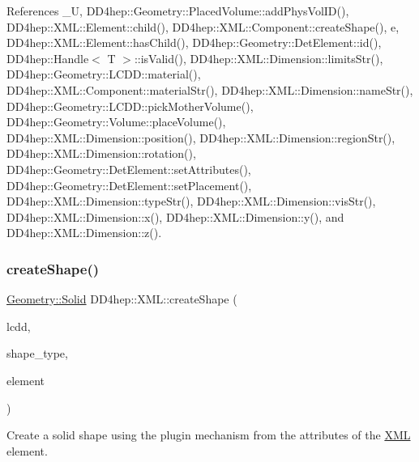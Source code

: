 References \+\_\+U, D\+D4hep\+::\+Geometry\+::\+Placed\+Volume\+::add\+Phys\+Vol\+I\+D(), D\+D4hep\+::\+X\+M\+L\+::\+Element\+::child(), D\+D4hep\+::\+X\+M\+L\+::\+Component\+::create\+Shape(), e, D\+D4hep\+::\+X\+M\+L\+::\+Element\+::has\+Child(), D\+D4hep\+::\+Geometry\+::\+Det\+Element\+::id(), D\+D4hep\+::\+Handle$<$ T $>$\+::is\+Valid(), D\+D4hep\+::\+X\+M\+L\+::\+Dimension\+::limits\+Str(), D\+D4hep\+::\+Geometry\+::\+L\+C\+D\+D\+::material(), D\+D4hep\+::\+X\+M\+L\+::\+Component\+::material\+Str(), D\+D4hep\+::\+X\+M\+L\+::\+Dimension\+::name\+Str(), D\+D4hep\+::\+Geometry\+::\+L\+C\+D\+D\+::pick\+Mother\+Volume(), D\+D4hep\+::\+Geometry\+::\+Volume\+::place\+Volume(), D\+D4hep\+::\+X\+M\+L\+::\+Dimension\+::position(), D\+D4hep\+::\+X\+M\+L\+::\+Dimension\+::region\+Str(), D\+D4hep\+::\+X\+M\+L\+::\+Dimension\+::rotation(), D\+D4hep\+::\+Geometry\+::\+Det\+Element\+::set\+Attributes(), D\+D4hep\+::\+Geometry\+::\+Det\+Element\+::set\+Placement(), D\+D4hep\+::\+X\+M\+L\+::\+Dimension\+::type\+Str(), D\+D4hep\+::\+X\+M\+L\+::\+Dimension\+::vis\+Str(), D\+D4hep\+::\+X\+M\+L\+::\+Dimension\+::x(), D\+D4hep\+::\+X\+M\+L\+::\+Dimension\+::y(), and D\+D4hep\+::\+X\+M\+L\+::\+Dimension\+::z().

\hypertarget{namespace_d_d4hep_1_1_x_m_l_a8ff2032ce30be011dde0b5696701605f}{}\label{namespace_d_d4hep_1_1_x_m_l_a8ff2032ce30be011dde0b5696701605f} 
\subsubsection{\texorpdfstring{create\+Shape()}{createShape()}}
{\footnotesize\ttfamily \hyperlink{namespace_d_d4hep_1_1_geometry_a83de90a8dcc7378ba47d54ef9a6a687b}{Geometry\+::\+Solid} D\+D4hep\+::\+X\+M\+L\+::create\+Shape (\begin{DoxyParamCaption}\item[{\hyperlink{class_d_d4hep_1_1_geometry_1_1_l_c_d_d}{Geometry\+::\+L\+C\+DD} \&}]{lcdd,  }\item[{const std\+::string \&}]{shape\+\_\+type,  }\item[{\hyperlink{class_d_d4hep_1_1_x_m_l_1_1_element}{X\+M\+L\+::\+Element}}]{element }\end{DoxyParamCaption})}



Create a solid shape using the plugin mechanism from the attributes of the \hyperlink{namespace_d_d4hep_1_1_x_m_l}{X\+ML} element. 



